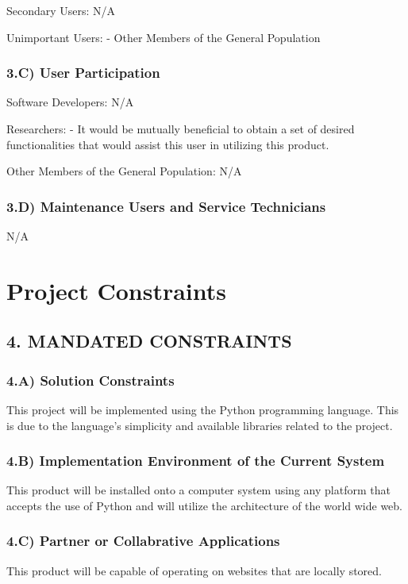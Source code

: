 \documentclass[12pt]{article}
\begin{document}
Secondary Users:
N/A

Unimportant Users:
- Other Members of the General Population

\subsubsection{3.C) User Participation}
Software Developers:
N/A

Researchers:
- It would be mutually beneficial to obtain a set of desired functionalities that would assist this user in utilizing this product.

Other Members of the General Population:
N/A

\subsubsection{3.D) Maintenance Users and Service Technicians}
N/A


\section{Project Constraints}

\subsection{4. MANDATED CONSTRAINTS}

\subsubsection{4.A) Solution Constraints}
	This project will be implemented using the Python programming language. This is due to the language’s simplicity and available libraries related to the project.

\subsubsection{4.B) Implementation Environment of the Current System}
This product will be installed onto a computer system using any platform that accepts the use of Python and will utilize the architecture of the world wide web.

\subsubsection{4.C) Partner or Collabrative Applications}
This product will be capable of operating on websites that are locally stored.
\end{document}
